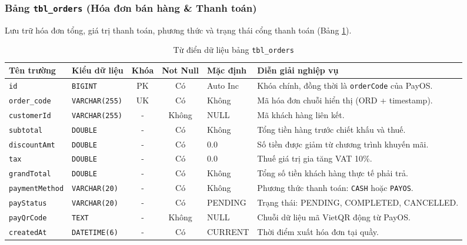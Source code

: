 \subsubsection{Bảng \texttt{tbl\_orders} (Hóa đơn bán hàng \& Thanh toán)}
Lưu trữ hóa đơn tổng, giá trị thanh toán, phương thức và trạng thái cổng thanh toán (Bảng \ref{tab:tbl_orders}).

\begin{table}[htbp]
\centering
\caption{Từ điển dữ liệu bảng \texttt{tbl\_orders}}
\label{tab:tbl_orders}
\vspace{2mm}
\begin{tabularx}{\textwidth}{|p{2.5cm}|p{2.8cm}|c|c|p{1.8cm}|X|}
\hline
\textbf{Tên trường} & \textbf{Kiểu dữ liệu} & \textbf{Khóa} & \textbf{Not Null} & \textbf{Mặc định} & \textbf{Diễn giải nghiệp vụ} \\ \hline
\texttt{id} & \texttt{BIGINT} & PK & Có & Auto Inc & Khóa chính, đồng thời là \texttt{orderCode} của PayOS. \\ \hline
\texttt{order\_code} & \texttt{VARCHAR(255)} & UK & Có & Không & Mã hóa đơn chuỗi hiển thị (ORD + timestamp). \\ \hline
\texttt{customerId} & \texttt{VARCHAR(255)} & - & Không & NULL & Mã khách hàng liên kết. \\ \hline
\texttt{subtotal} & \texttt{DOUBLE} & - & Có & Không & Tổng tiền hàng trước chiết khấu và thuế. \\ \hline
\texttt{discountAmt} & \texttt{DOUBLE} & - & Có & 0.0 & Số tiền được giảm từ chương trình khuyến mãi. \\ \hline
\texttt{tax} & \texttt{DOUBLE} & - & Có & 0.0 & Thuế giá trị gia tăng VAT 10\%. \\ \hline
\texttt{grandTotal} & \texttt{DOUBLE} & - & Có & Không & Tổng số tiền khách hàng thực tế phải trả. \\ \hline
\texttt{paymentMethod}& \texttt{VARCHAR(20)} & - & Có & Không & Phương thức thanh toán: \texttt{CASH} hoặc \texttt{PAYOS}. \\ \hline
\texttt{payStatus} & \texttt{VARCHAR(20)} & - & Có & PENDING & Trạng thái: PENDING, COMPLETED, CANCELLED. \\ \hline
\texttt{payQrCode} & \texttt{TEXT} & - & Không & NULL & Chuỗi dữ liệu mã VietQR động từ PayOS. \\ \hline
\texttt{createdAt} & \texttt{DATETIME(6)} & - & Có & CURRENT & Thời điểm xuất hóa đơn tại quầy. \\ \hline
\end{tabularx}
\end{table}

